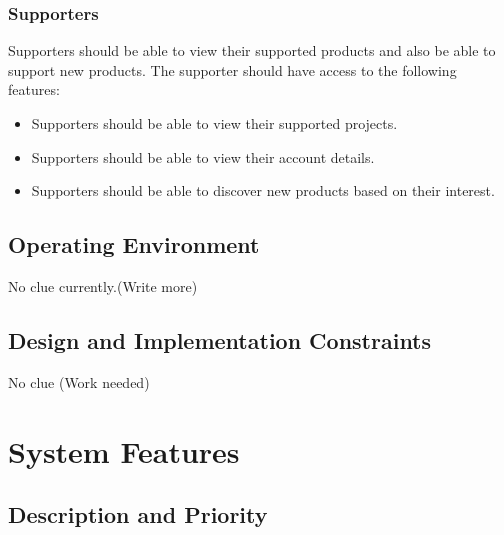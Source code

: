 \documentclass{report}[12pt]
\begin{document}
\subsection{Supporters}
Supporters should be able to view their supported products and also be able to support new products. The supporter should have access to the following features:
\begin{itemize}
    \item Supporters should be able to view their supported projects.
    \item Supporters should be able to view their account details. 
    \item Supporters should be able to discover new products based on their interest. 
\end{itemize}

\section{Operating Environment}
No clue currently.(Write more)

\section{Design and Implementation Constraints}
No clue (Work needed)

\chapter{System Features}
\section{Description and Priority}
\end{document}
